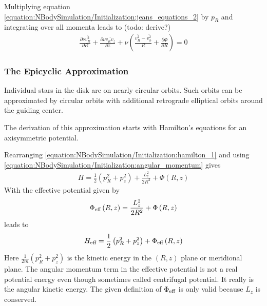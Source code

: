 \documentclass[letterpaper,10pt,english]{sphinxmanual}
\begin{document}
					\sphinxAtStartPar
					Multiplying equation \eqref{equation:NBodySimulation/Initialization:jeans_equations_2} by \(p_R\) and integrating over all momenta leads to (todo: derive?)
					\begin{equation}\label{equation:NBodySimulation/Initialization:jeans_equations_3}
					\begin{split}\frac{\partial \nu \overline{v_R^2}}{\partial R}+\frac{\partial \nu \overline{v_Rv_z}}{\partial z} +
					 \nu \left ( \frac{\overline{v_R^2}-\overline{v_\phi^2}}{R} + \frac{\partial\Phi}{\partial R}\right ) = 0\end{split}
					\end{equation}
				
				\subsubsection{The Epicyclic Approximation}
					\label{\detokenize{NBodySimulation/Initialization:the-epicyclic-approximation}}
					\sphinxAtStartPar
					Individual stars in the disk are on nearly circular orbits.
					Such orbits can be approximated by circular orbits with additional retrograde elliptical orbits around the guiding center.
					
					\sphinxAtStartPar
					The derivation of this approximation starts with Hamilton’s equations for an axisymmetric potential.
					
					\sphinxAtStartPar
					Rearranging \eqref{equation:NBodySimulation/Initialization:hamilton_1} and using \eqref{equation:NBodySimulation/Initialization:angular_momentum} gives
					\begin{equation*}
					\begin{split}H = \frac{1}{2}\left( p_{R}^2+p_z^2 \right)+\frac{L_z^2}{2R^2}+\Phi\left(R,z\right)\end{split}
					\end{equation*}
					\sphinxAtStartPar
					With the effective potential given by
					\begin{equation*}
					\begin{split}\Phi_{\textup{eff}}\left(R,z\right) = \frac{L_z^2}{2R^2}+\Phi\left(R,z\right)\end{split}
					\end{equation*}
					\sphinxAtStartPar
					leads to
					\begin{equation*}
					\begin{split}H_{\textup{eff}} = \frac{1}{2}\left( p_{R}^2+p_z^2 \right)+\Phi_{\textup{eff}}\left(R,z\right)\end{split}
					\end{equation*}
					\sphinxAtStartPar
					Here \(\frac{1}{2m}\left( p_{R}^2+p_z^2 \right)\) is the kinetic energy in the \(\left( R,z \right)\) plane or meridional plane.
					The angular momentum term in the effective potential is not a real potential energy even though sometimes called centrifugal potential.
					It really is the angular kinetic energy. The given definition of \(\Phi_{\textup{eff}}\) is only valid because \(L_z\) is conserved.
					
\end{document}
